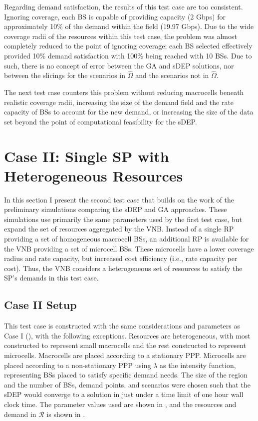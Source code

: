 \documentclass[12pt,dvipsnames]{report}
\begin{document}
Regarding demand satisfaction, the results of this test case are too consistent.  Ignoring coverage, each BS is capable of providing capacity (2 Gbps) for approximately 10\% of the demand within the field (19.97 Gbps).  Due to the wide coverage radii of the resources within this test case, the problem was almost completely reduced to the point of ignoring coverage; each BS selected effectively provided 10\% demand satisfaction with 100\% being reached with 10 BSs.  Due to such, there is no concept of error between the GA and sDEP solutions, nor between the slicings for the scenarios in $\hat{\Omega}$ and the scenarios not in $\hat{\Omega}$.

The next test case counters this problem without reducing macrocells beneath realistic coverage radii, increasing the size of the demand field and the rate capacity of BSs to account for the new demand, or increasing the size of the data set beyond the point of computational feasibility for the sDEP.

\section{Case II: Single SP with Heterogeneous Resources} \label{sec:caseII}

In this section I present the second test case that builds on the work of the preliminary simulations comparing the sDEP and GA approaches.  These simulations use primarily the same parameters used by the first test case, but expand the set of resources aggregated by the VNB.  Instead of a single RP providing a set of homogeneous macrocell BSs, an additional RP is available for the VNB providing a set of microcell BSs.  These microcells have a lower coverage radius and rate capacity, but increased cost efficiency (i.e., rate capacity per cost).  Thus, the VNB considers a heterogeneous set of resources to satisfy the SP's demands in this test case.

\subsection{Case II Setup} \label{subsec:caseII_setup}

This test case is constructed with the same considerations and parameters as Case I (), with the following exceptions.  Resources are heterogeneous, with most constructed to represent small macrocells and the rest constructed to represent microcells.  Macrocells are placed according to a stationary PPP.  Microcells are placed according to a non-stationary PPP using $\lambda$ as the intensity function, representing BSs placed to satisfy specific demand needs.  The size of the region and the number of BSs, demand points, and scenarios were chosen such that the sDEP would converge to a solution in just under a time limit of one hour wall clock time.  The parameter values used are shown in , and the resources and demand in $\mathcal{R}$ is shown in .
\end{document}
